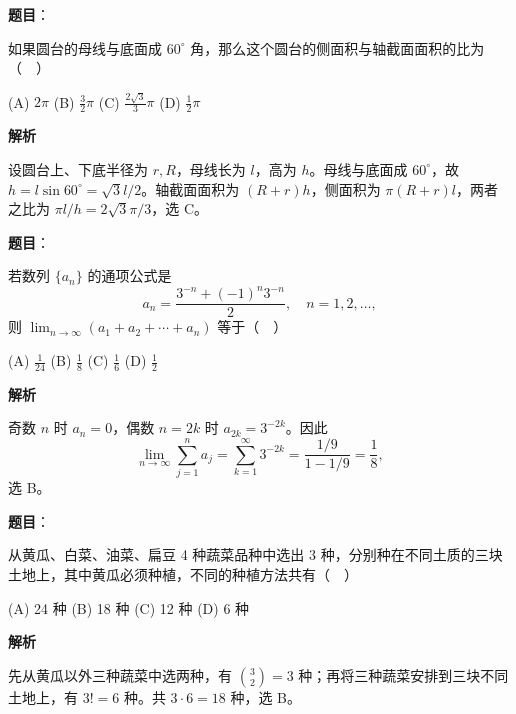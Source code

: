 \begin{answer}

\textbf{题目}：

如果圆台的母线与底面成 \(60^\circ\) 角，那么这个圆台的侧面积与轴截面面积的比为（　）

    (A) \(2\pi\)
    (B) \(\frac32\pi\)
    (C) \(\frac{2\sqrt3}{3}\pi\)
    (D) \(\frac12\pi\)

\textbf{解析}

设圆台上、下底半径为 \(r,R\)，母线长为 \(l\)，高为 \(h\)。母线与底面成 \(60^\circ\)，故 \(h=l\sin60^\circ=\sqrt3l/2\)。轴截面面积为 \((R+r)h\)，侧面积为 \(\pi(R+r)l\)，两者之比为 \(\pi l/h=2\sqrt3\pi/3\)，选 C。


\end{answer}
\begin{answer}

\textbf{题目}：

若数列 \(\{a_n\}\) 的通项公式是
\nopagebreak[4]
\[
a_n=\frac{3^{-n}+(-1)^n3^{-n}}2,\quad n=1,2,\ldots,
\]
则 \(\displaystyle\lim_{n\to\infty}(a_1+a_2+\cdots+a_n)\) 等于（　）

    (A) \(\frac1{24}\)
    (B) \(\frac18\)
    (C) \(\frac16\)
    (D) \(\frac12\)

\textbf{解析}

奇数 \(n\) 时 \(a_n=0\)，偶数 \(n=2k\) 时 \(a_{2k}=3^{-2k}\)。因此
\nopagebreak[4]
\[
\lim_{n\to\infty}\sum_{j=1}^n a_j=\sum_{k=1}^{\infty}3^{-2k}=\frac{1/9}{1-1/9}=\frac18,
\]
选 B。


\end{answer}
\begin{answer}

\textbf{题目}：

从黄瓜、白菜、油菜、扁豆 4 种蔬菜品种中选出 3 种，分别种在不同土质的三块土地上，其中黄瓜必须种植，不同的种植方法共有（　）

    (A) 24 种
    (B) 18 种
    (C) 12 种
    (D) 6 种

\textbf{解析}

先从黄瓜以外三种蔬菜中选两种，有 \(\binom32=3\) 种；再将三种蔬菜安排到三块不同土地上，有 \(3!=6\) 种。共 \(3\cdot6=18\) 种，选 B。


\end{answer}
